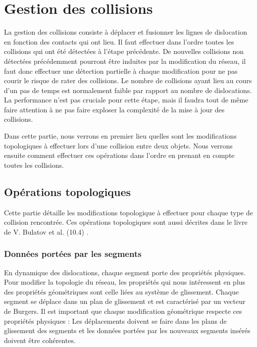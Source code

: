 \documentclass[11pt,class=article,float=false,crop=false]{standalone}
\begin{document}
\section{Gestion des collisions}

La gestion des collisions consiste à déplacer et fusionner les lignes de dislocation en fonction des contacts qui ont lieu. Il faut effectuer dans l'ordre toutes les collisions qui ont été détectées à l'étape précédente. De nouvelles collisions non détectées précédemment pourront être induites par la modification du réseau, il faut donc effectuer une détection partielle à chaque modification pour ne pas courir le risque de rater des collisions. Le nombre de collisions ayant lieu au cours d'un pas de temps est normalement faible par rapport au nombre de dislocations. La performance n'est pas cruciale pour cette étape, mais il faudra tout de même faire attention à ne pas faire exploser la complexité de la mise à jour des collisions. 

Dans cette partie, nous verrons en premier lieu quelles sont les modifications topologiques à effectuer lors d'une collision entre deux objets. Nous verrons ensuite comment effectuer ces opérations dans l'ordre en prenant en compte toutes les collisions.

\subsection{Opérations topologiques}

\label{sec:operations_topologiques}

Cette partie détaille les modifications topologique à effectuer pour chaque type de collision rencontrée. Ces opérations topologiques sont aussi décrites dans le livre de V. Bulatov et al. (10.4) .

\subsubsection{Données portées par les segments}

En dynamique des dislocations, chaque segment porte des propriétés physiques. Pour modifier la topologie du réseau, les propriétés qui nous intéressent en plus des propriétés géométriques sont celle liées au système de glissement. Chaque segment se déplace dans un plan de glissement et est caractérisé par un vecteur de Burgers. Il est important que chaque modification géométrique respecte ces propriétés physiques : Les déplacements doivent se faire dans les plans de glissement des segments et les données portées par les nouveaux segments insérés doivent être cohérentes.
\end{document}
